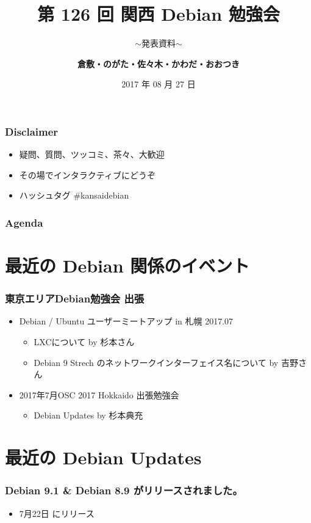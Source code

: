 \documentclass[cjk,dvipdfmx,12pt,compress,%
hyperref={bookmarks=true,bookmarksnumbered=true,bookmarksopen=false,%
colorlinks=false,%
pdftitle={第 120 回 関西 Debian 勉強会},%
pdfauthor={倉敷・のがた・佐々木・かわだ・おおつき},%
pdfsubject={資料},%
}]{beamer}
\title{第 126 回 関西 Debian 勉強会}
\subtitle{$\sim$発表資料$\sim$}
\author[おおつき]{{\large\bf 倉敷・のがた・佐々木・かわだ・おおつき}}
\institute[Debian JP]{{\normalsize\tt 関西 Debian 勉強会}}
\date{{\small 2017 年 08 月 27 日}}
\begin{document}
\begin{frame}
\titlepage
\end{frame}

\begin{frame}[fragile]
  \frametitle{Disclaimer}
  \begin{itemize}
  \item 疑問、質問、ツッコミ、茶々、\alert{大歓迎}
  \item その場でインタラクティブにどうぞ
  \item ハッシュタグ \#kansaidebian
  \end{itemize}
\end{frame}

\frametitle{Agenda}

\tableofcontents

\section{最近の Debian 関係のイベント}

\begin{frame}[fragile]
  \frametitle{東京エリアDebian勉強会 出張}
  \begin{itemize}
    \item Debian / Ubuntu ユーザーミートアップ in 札幌 2017.07
    \begin{itemize}
        \item{LXCについて by 杉本さん}
        \item{Debian 9 Strech のネットワークインターフェイス名について by 吉野さん}
    \end{itemize}
    \item 2017年7月OSC 2017 Hokkaido 出張勉強会
    \begin{itemize}
    	\item{Debian Updates by 杉本典充}
    \end{itemize}
  \end{itemize}
\end{frame}

\section{最近の Debian Updates}
\begin{frame}[fragile]
  \frametitle{Debian 9.1 \& Debian 8.9  がリリースされました。}
  \begin{itemize}
    \item 7月22日 にリリース 
  \end{itemize}
\end{frame}
\end{document}
